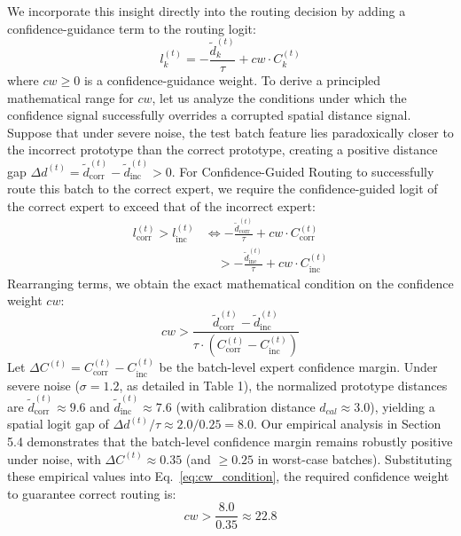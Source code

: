 \documentclass{article}
\theoremstyle{plain}
\theoremstyle{definition}
\theoremstyle{remark}
\begin{document}
We incorporate this insight directly into the routing decision by adding a confidence-guidance term to the routing logit:
\begin{equation}
    l_k^{(t)} = -\frac{\tilde{d}_k^{(t)}}{\tau} + cw \cdot C_k^{(t)}
\end{equation}
where $cw \ge 0$ is a confidence-guidance weight. To derive a principled mathematical range for $cw$, let us analyze the conditions under which the confidence signal successfully overrides a corrupted spatial distance signal. Suppose that under severe noise, the test batch feature lies paradoxically closer to the incorrect prototype than the correct prototype, creating a positive distance gap $\Delta d^{(t)} = \tilde{d}_{\text{corr}}^{(t)} - \tilde{d}_{\text{inc}}^{(t)} > 0$. For Confidence-Guided Routing to successfully route this batch to the correct expert, we require the confidence-guided logit of the correct expert to exceed that of the incorrect expert:
\begin{align}
    l_{\text{corr}}^{(t)} > l_{\text{inc}}^{(t)} &\iff -\frac{\tilde{d}_{\text{corr}}^{(t)}}{\tau} + cw \cdot C_{\text{corr}}^{(t)} \nonumber \\
    &\quad > -\frac{\tilde{d}_{\text{inc}}^{(t)}}{\tau} + cw \cdot C_{\text{inc}}^{(t)}
\end{align}
Rearranging terms, we obtain the exact mathematical condition on the confidence weight $cw$:
\begin{equation}
    cw > \frac{\tilde{d}_{\text{corr}}^{(t)} - \tilde{d}_{\text{inc}}^{(t)}}{\tau \cdot \left( C_{\text{corr}}^{(t)} - C_{\text{inc}}^{(t)} \right)}
    \label{eq:cw_condition}
\end{equation}
Let $\Delta C^{(t)} = C_{\text{corr}}^{(t)} - C_{\text{inc}}^{(t)}$ be the batch-level expert confidence margin. Under severe noise ($\sigma=1.2$, as detailed in Table 1), the normalized prototype distances are $\tilde{d}_{\text{corr}}^{(t)} \approx 9.6$ and $\tilde{d}_{\text{inc}}^{(t)} \approx 7.6$ (with calibration distance $d_{cal} \approx 3.0$), yielding a spatial logit gap of $\Delta d^{(t)} / \tau \approx 2.0 / 0.25 = 8.0$. Our empirical analysis in Section 5.4 demonstrates that the batch-level confidence margin remains robustly positive under noise, with $\Delta C^{(t)} \approx 0.35$ (and $\ge 0.25$ in worst-case batches). Substituting these empirical values into Eq.~\eqref{eq:cw_condition}, the required confidence weight to guarantee correct routing is:
\begin{equation}
    cw > \frac{8.0}{0.35} \approx 22.8
    \label{eq:cw_empirical}
\end{equation}
\end{document}
